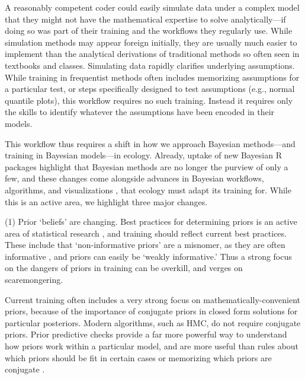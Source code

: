 \documentclass[11pt]{article}
\begin{document}
A reasonably competent coder could easily simulate data under a complex model that they might not have the mathematical expertise to solve analytically---if doing so was part of their training and the workflows they regularly use. While simulation methods may appear foreign initially, they are usually much easier to implement than the analytical derivations of traditional methods so often seen in textbooks and classes.   %
Simulating data rapidly clarifies underlying assumptions. While training in frequentist methods often includes memorizing assumptions for a particular test, or steps specifically designed to test assumptions (e.g., normal quantile plots), this workflow requires no such training. Instead it requires only the skills to identify whatever the assumptions have been encoded in their models. %

This workflow thus requires a shift in how we approach Bayesian methods---and training in Bayesian models---in ecology. Already, uptake of new Bayesian \textsf{R} packages highlight that Bayesian methods are no longer the purview of only a few, and these changes come alongside advances in Bayesian workflows, algorithms, and visualizations \citep[e.g.][]{betanworkflow,vandeschoot2021,gabryvis}, that ecology must adapt its training for. While this is an active area, we highlight three major changes.

(1) Prior `beliefs' are changing. Best practices for determining priors is an active area of statistical research \citep{BDA,regotherstories,betanprior}, and training should reflect current best practices. These include that `non-informative priors' are a misnomer, as they are often informative  \citep{lemoine2019}, and priors can easily be `weakly informative.' Thus a strong focus on the dangers of priors in training can be overkill, and verges on scaremongering. 

Current training often includes a very strong focus on mathematically-convenient priors, because of the importance of conjugate priors in closed form solutions for particular posteriors. Modern algorithms, such as HMC, do not require conjugate priors. Prior predictive checks provide a far more powerful way to understand how priors work within a particular model, and are more useful than rules about which priors should be fit in certain cases or memorizing which priors are conjugate \citep{betanprior}. %
\end{document}
